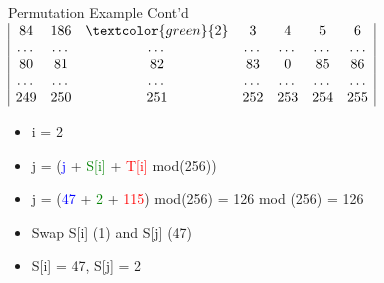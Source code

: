 \documentclass[
	aspectratio=169,	%
	onlytextwidth,		%
	t,					%
	]{beamer}
\begin{document}
\begin{frame}{Permutation Example Cont'd}
	$\begin{array}{|ccccccc|}
		84 & 186 & \textcolor{green}{2} & 3 & 4 & 5 & 6 \\
		\dots & \dots & \dots & \dots & \dots & \dots & \dots \\
		80 & 81 & 82 & 83 & 0 & 85 & 86 \\
		\dots & \dots & \dots & \dots & \dots & \dots & \dots \\
		249 & 250 & 251 & 252 & 253 & 254 & 255 \\
	\end{array}$
	\begin{itemize}
		\item i = 2
		\item j = (\textcolor{blue} {j} + \textcolor{green}{S[i]} + \textcolor{red}{T[i]} mod(256))
		\item j = (\textcolor{blue} {47} + \textcolor{green} {2} + \textcolor{red} {115}) mod(256) = 126 mod (256) = 126
		\item Swap S[i] (1) and S[j] (47)
		\item S[i] = 47, S[j] = 2
	\end{itemize}
\end{frame}
\end{document}
